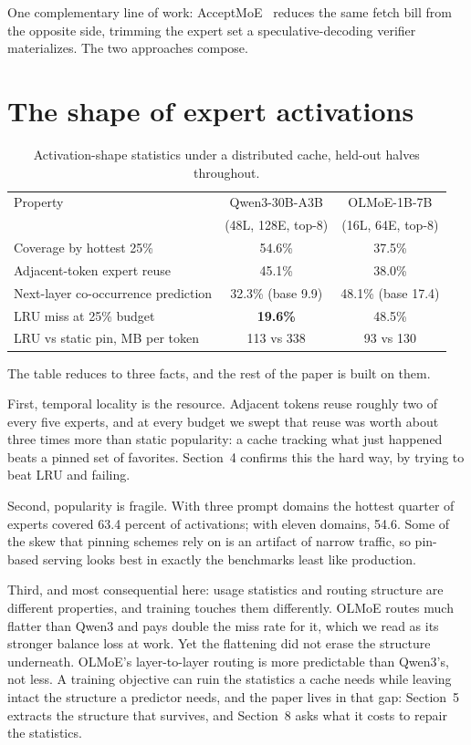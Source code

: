 \documentclass[11pt]{article}
\begin{document}
One complementary line of work: AcceptMoE~\citep{acceptmoe} reduces the same fetch bill from the opposite side, trimming the expert set a speculative-decoding verifier materializes. The two approaches compose.

\section{The shape of expert activations}
\begin{table}[h]
\centering\small
\begin{tabular}{lcc}
\toprule
Property & Qwen3-30B-A3B & OLMoE-1B-7B \\
 & (48L, 128E, top-8) & (16L, 64E, top-8) \\
\midrule
Coverage by hottest 25\% & 54.6\% & 37.5\% \\
Adjacent-token expert reuse & 45.1\% & 38.0\% \\
Next-layer co-occurrence prediction & 32.3\% (base 9.9) & 48.1\% (base 17.4) \\
LRU miss at 25\% budget & \textbf{19.6\%} & 48.5\% \\
LRU vs static pin, MB per token & 113 vs 338 & 93 vs 130 \\
\bottomrule
\end{tabular}
\caption{Activation-shape statistics under a distributed cache, held-out halves throughout.}
\end{table}

The table reduces to three facts, and the rest of the paper is built on them.

First, temporal locality is the resource. Adjacent tokens reuse roughly two of every five experts, and at every budget we swept that reuse was worth about three times more than static popularity: a cache tracking what just happened beats a pinned set of favorites. Section~4 confirms this the hard way, by trying to beat LRU and failing.

Second, popularity is fragile. With three prompt domains the hottest quarter of experts covered 63.4 percent of activations; with eleven domains, 54.6. Some of the skew that pinning schemes rely on is an artifact of narrow traffic, so pin-based serving looks best in exactly the benchmarks least like production.

Third, and most consequential here: usage statistics and routing structure are different properties, and training touches them differently. OLMoE routes much flatter than Qwen3 and pays double the miss rate for it, which we read as its stronger balance loss at work. Yet the flattening did not erase the structure underneath. OLMoE's layer-to-layer routing is more predictable than Qwen3's, not less. A training objective can ruin the statistics a cache needs while leaving intact the structure a predictor needs, and the paper lives in that gap: Section~5 extracts the structure that survives, and Section~8 asks what it costs to repair the statistics.
\end{document}
